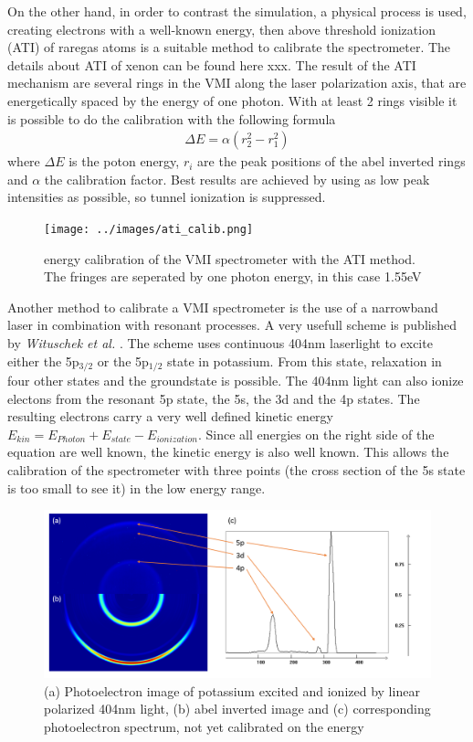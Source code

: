 On the other hand, in order to contrast the simulation, a physical process is used, creating electrons with a well-known energy, then above threshold ionization (ATI) of raregas atoms is a suitable method to calibrate the spectrometer. The details about ATI of xenon can be found here xxx. The result of the ATI mechanism are several rings in the VMI along the laser polarization axis, that are energetically spaced by the energy of one photon. With at least 2 rings visible it is possible to do the calibration with the following formula
\begin{align*}
\Delta E = \alpha (r_2^2-r_1^2)
\end{align*}
where $\Delta E$ is the poton energy, $r_i$ are the peak positions of the abel inverted rings and $\alpha$ the calibration factor. Best results are achieved by using as low peak intensities as possible, so tunnel ionization is suppressed.

\begin{figure}[h!]
\centering
\texttt{[image: ../images/ati\_calib.png]}
\caption{energy calibration of the VMI spectrometer with the ATI method. The fringes are seperated by one photon energy, in this case 1.55eV}
\end{figure}

Another method to calibrate a VMI spectrometer is the use of a narrowband laser in combination with resonant processes. A very usefull scheme is published by \textit{Wituschek et al.} \cite{wituschek_simple_2016}. The scheme uses continuous 404nm laserlight to excite either the 5p${}_{3/2}$ or the 5p${}_{1/2}$ state in potassium. From this state, relaxation in four other states and the groundstate is possible. The 404nm light can also ionize electons from the resonant 5p state, the 5s, the 3d and the 4p states. The resulting electrons carry a very well defined kinetic energy $E_{kin}=E_{Photon}+E_{state}-E_{ionization}$. Since all energies on the right side of the equation are well known, the kinetic energy is also well known. This allows the calibration of the spectrometer with three points (the cross section of the 5s state is too small to see it) in the low energy range.

\begin{figure}
\centering
\includegraphics[scale=0.5]{../images/potassium_calib.png}
\caption{(a) Photoelectron image of potassium excited and ionized by linear polarized 404nm light, (b) abel inverted image and (c) corresponding photoelectron spectrum, not yet calibrated on the energy}
\end{figure}


